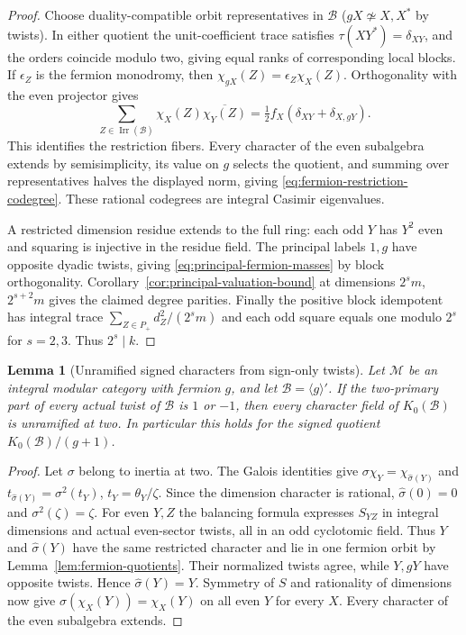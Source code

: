 \documentclass[11pt,a4paper]{article}
\numberwithin{equation}{section}
\newtheorem{lemma}[theorem]{Lemma}
\theoremstyle{remark}
\newcommand{\M}{\mathcal M}
\newcommand{\Irr}{\operatorname{Irr}}
\newcommand{\K}{K_0}
\begin{document}
\begin{proof}
Choose duality-compatible orbit representatives in $\mathcal B$
($gX\not\simeq X,X^*$ by twists). In either quotient the
unit-coefficient trace satisfies $\tau(XY^*)=\delta_{XY}$, and
the orders coincide modulo two, giving equal ranks of corresponding
local blocks. If $\epsilon_Z$ is the fermion monodromy, then
$\chi_{gX}(Z)=\epsilon_Z\chi_X(Z)$. Orthogonality with the even
projector gives
\begin{equation}\label{eq:graded-orthogonality}
 \sum_{Z\in\Irr(\mathcal B)}\chi_X(Z)\overline{\chi_Y(Z)}
 =\tfrac12 f_X(\delta_{XY}+\delta_{X,gY}).
\end{equation}
This identifies the restriction fibers. Every character of the even
subalgebra extends by semisimplicity, its value on $g$ selects the
quotient, and summing over representatives halves the displayed
norm, giving \eqref{eq:fermion-restriction-codegree}. These rational
codegrees are integral Casimir eigenvalues.

A restricted dimension residue extends to the full ring: each odd
$Y$ has $Y^2$ even and squaring is injective in the residue field.
The principal labels $1,g$ have opposite dyadic twists, giving
\eqref{eq:principal-fermion-masses} by block orthogonality.
Corollary~\ref{cor:principal-valuation-bound} at dimensions
$2^s m$, $2^{s+2}m$ gives the claimed degree parities. Finally the
positive block idempotent has integral trace
$\sum_{Z\in P_+}d_Z^2/(2^sm)$ and each odd square equals one
modulo $2^s$ for $s=2,3$. Thus $2^s\mid k$.
\end{proof}

\begin{lemma}[Unramified signed characters from sign-only twists]\label{fam:M:4.6}
\label{lem:signed-unramified-sign-twists}
Let $\M$ be an integral modular category with fermion $g$, and let
$\mathcal B=\langle g\rangle'$. If the two-primary part of every
actual twist of $\mathcal B$ is $1$ or $-1$, then every character
field of $\K(\mathcal B)$ is unramified at two. In particular this
holds for the signed quotient $\K(\mathcal B)/(g+1)$.
\end{lemma}
\begin{proof}
Let $\sigma$ belong to inertia at two. The Galois identities
\cite[Theorem~II]{DLNCongruence} give
$\sigma\chi_Y=\chi_{\widehat\sigma(Y)}$ and
$t_{\widehat\sigma(Y)}=\sigma^2(t_Y)$, $t_Y=\theta_Y/\zeta$.
Since the dimension character is rational, $\widehat\sigma(0)=0$
and $\sigma^2(\zeta)=\zeta$. For even $Y,Z$ the balancing formula
expresses $S_{YZ}$ in integral dimensions and actual even-sector
twists, all in an odd cyclotomic field. Thus $Y$ and
$\widehat\sigma(Y)$ have the same restricted character and lie
in one fermion orbit by Lemma~\ref{lem:fermion-quotients}.
Their normalized twists agree, while $Y,gY$ have opposite twists.
Hence $\widehat\sigma(Y)=Y$. Symmetry of $S$ and rationality of
dimensions now give $\sigma(\chi_X(Y))=\chi_X(Y)$ on all even $Y$
for every $X$. Every character of the even subalgebra extends.
\end{proof}
\end{document}
